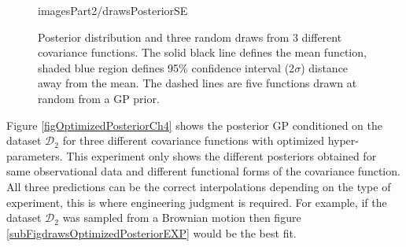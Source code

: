 \begin{figure}[!ht]
{        {imagesPart2/drawsPosteriorSE}
        \label{subFigdrawsPosteriorSE}
  }\quad
\caption{Posterior distribution and three random draws from 3 different covariance functions. The solid black line defines the mean function, shaded blue region defines 95\% confidence interval (2\(\sigma\)) distance away from the mean. The dashed lines are five functions drawn at random from a GP prior. }
       \label{figpreOptimizedPosteriorCh5}
\end{figure}


Figure \ref{figOptimizedPosteriorCh4} shows the posterior GP conditioned on the dataset \(\mathcal{D}_{2}\) for three different covariance functions with optimized hyper-parameters. This experiment only shows the different posteriors obtained for same observational data and different functional forms of the covariance function. All three predictions can be the correct interpolations depending on the type of experiment, this is where engineering judgment is required. For example, if the dataset \(\mathcal{D}_{2}\) was sampled from a Brownian motion then figure \ref{subFigdrawsOptimizedPosteriorEXP} would be the best fit. 

